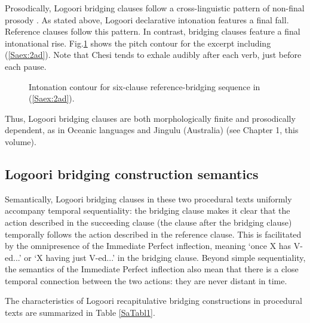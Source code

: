 \documentclass[output=paper]{LSP/langsci}
\begin{document}
Prosodically, Logoori bridging clauses follow a cross-linguistic pattern of non-final prosody \citep{devries.2005}. As stated above, Logoori declarative intonation features a final fall. Reference clauses follow this pattern. In contrast, bridging clauses feature a final intonational rise. Fig.\ref{SaFig1} shows the pitch contour for the excerpt including (\ref{Saex:2ad}). Note that Chesi tends to exhale audibly after each verb, just before each pause.
%


\begin{figure}[ht]
\caption{Intonation contour for six-clause reference-bridging sequence in (\ref{Saex:2ad}). \label{SaFig1}}
\end{figure}

Thus, Logoori bridging clauses are both morphologically finite and prosodically dependent, as in Oceanic languages and Jingulu (Australia) (see Chapter 1, this volume).

\subsection{Logoori bridging construction semantics}
\label{Sasemantics}
Semantically, Logoori bridging clauses in these two procedural texts uniformly accompany temporal sequentiality: the bridging clause makes it clear that the action described in the succeeding clause (the clause after the bridging clause) temporally follows the action described in the reference clause. This is facilitated by the omnipresence of the Immediate Perfect inflection, meaning `once X has V-ed...' or `X having just V-ed...' in the bridging clause. Beyond simple sequentiality, the semantics of the Immediate Perfect inflection also mean that there is a close temporal connection between the two actions: they are never distant in time.

The characteristics of Logoori recapitulative bridging constructions in procedural texts are summarized in Table \ref{SaTabl1}.
\end{document}
